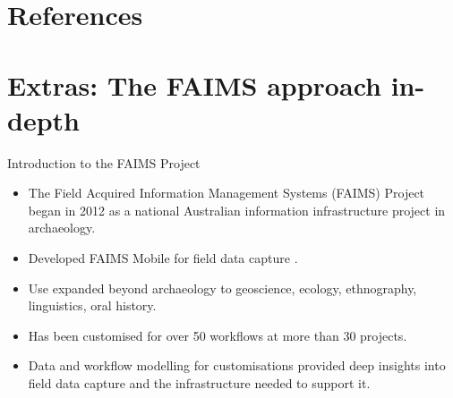 \documentclass[aspectratio=169, 12pt]{beamer} %
\begin{document}
\section{References}


  
%   
%   

\begin{multicols}{2}[]



\end{multicols}


\section{Extras: The FAIMS approach in-depth}

\begin{frame}{Introduction to the FAIMS Project}
    \begin{itemize}[label=\textbullet]
        \item The Field Acquired Information Management Systems (FAIMS) Project began in 2012 as a national Australian information infrastructure project in archaeology.
        \item Developed FAIMS Mobile for field data capture \cite{Ballsun-Stanton2018-zd}.
        \item Use expanded beyond archaeology to geoscience, ecology, ethnography, linguistics, oral history.
        \item Has been customised for over 50 workflows at more than 30 projects. 
        \item Data and workflow modelling for customisations provided deep insights into field data capture and the infrastructure needed to support it.
    \end{itemize}
\end{frame}
\end{document}

